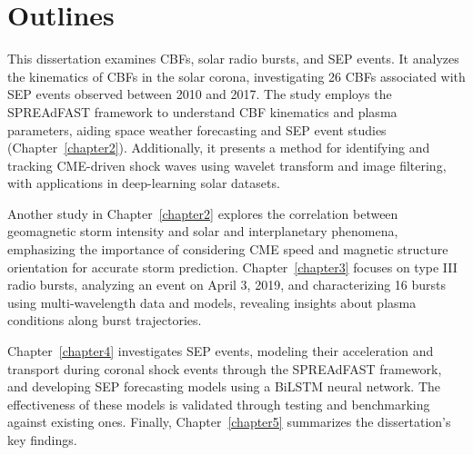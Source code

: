 \section{Outlines}
This dissertation examines CBFs, solar radio bursts, and SEP events. It analyzes the kinematics of CBFs in the solar corona, investigating 26 CBFs associated with SEP events observed between 2010 and 2017. The study employs the SPREAdFAST framework to understand CBF kinematics and plasma parameters, aiding space weather forecasting and SEP event studies (Chapter~\ref{chapter2}). Additionally, it presents a method for identifying and tracking CME-driven shock waves using wavelet transform and image filtering, with applications in deep-learning solar datasets.

Another study in Chapter~\ref{chapter2} explores the correlation between geomagnetic storm intensity and solar and interplanetary phenomena, emphasizing the importance of considering CME speed and magnetic structure orientation for accurate storm prediction. Chapter~\ref{chapter3} focuses on type III radio bursts, analyzing an event on April 3, 2019, and characterizing 16 bursts using multi-wavelength data and models, revealing insights about plasma conditions along burst trajectories.

Chapter~\ref{chapter4} investigates SEP events, modeling their acceleration and transport during coronal shock events through the SPREAdFAST framework, and developing SEP forecasting models using a BiLSTM neural network. The effectiveness of these models is validated through testing and benchmarking against existing ones. Finally, Chapter~\ref{chapter5} summarizes the dissertation's key findings.